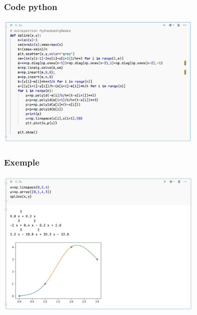 \documentclass{beamer}
\begin{document}
\begin{frame}
 \frametitle{Code python}
\begin{center}
\includegraphics[width=10cm]{images/interpolationDHermite03.png}
\end{center}
\end{frame}

\begin{frame}
 \frametitle{Exemple}
\begin{center}
\includegraphics[width=10cm]{images/interpolationDHermite04.png}
\end{center}
\end{frame}
\end{document}
